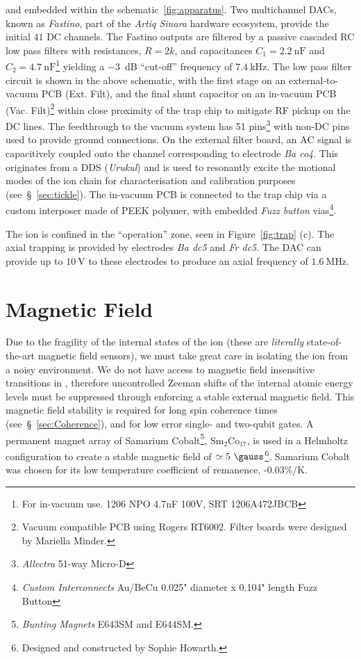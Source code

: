     \noindent and embedded within the schematic~\ref{fig:apparatus}. Two
    multichannel DACs, known as \emph{Fastino}, part of the \emph{Artiq Sinara} hardware
    ecosystem, provide the initial $41$ DC channels. 
    The Fastino outputs are filtered by a passive cascaded RC low pass filters with resistances, $R=2k$, and capacitances $C_1 = 2.2~\unit{\nano\farad}$ and $C_2 = 4.7~\unit{\nano\farad}$\footnote{For in-vacuum use. 1206 NPO 4.7nF 100V, SRT 1206A472JBCB} yielding a $-3$~dB ``cut-off'' frequency of $7.4~\unit{\kilo\hertz}$. The low pass filter circuit is shown in the above schematic, with the first stage on an external-to-vacuum PCB (Ext. Filt), and the 
    final shunt capacitor on an in-vacuum PCB (Vac. Filt)\footnote{Vacuum compatible PCB using Rogers RT6002. Filter boards were designed by Mariella Minder.} within close proximity of the trap chip to mitigate RF pickup on the DC lines. The feedthrough to the vacuum system has 51 pins\footnote{\emph{Allectra} 51-way Micro-D} with non-DC pins used to provide ground connections.
    On the external filter board, an AC signal is capacitively coupled onto the channel corresponding to electrode \textit{Ba co4}.
    This originates from a DDS (\emph{Urukul}) and is used to resonantly excite the motional modes of the ion chain for characterisation and calibration purposes (see~\S~\ref{sec:tickle}).
    The in-vacuum PCB is connected to the trap chip via a custom interposer made of PEEK polymer, with embedded \emph{Fuzz button} vias\footnote{\emph{Custom Interconnects} Au/BeCu 0.025" diameter x 0.104" length Fuzz Button}.

    The ion is confined in the ``operation'' zone, seen in
    Figure~\ref{fig:trap} (c). The axial trapping is provided by electrodes
    \textit{Ba dc5} and \textit{Fr dc5}.
    The DAC can provide up to $10~\unit{\volt}$ to these electrodes to produce an axial frequency of $1.6~\unit{\mega\hertz}$.

\section{Magnetic Field}
\label{sec:Magnetic Field}
    Due to the fragility of
    the internal states of the ion (these are \textit{literally}
    state-of-the-art magnetic field sensors), we must take great care in
    isolating the ion from a noisy
    environment.
    We do not have access to magnetic field insensitive transitions in \ca , therefore uncontrolled Zeeman shifts of the internal atomic energy levels must be suppressed through enforcing a stable external magnetic field. This magnetic field stability is required for long spin
    coherence times (see~\S~\ref{sec:Coherence}), and for low error single-
    and two-qubit gates. A permanent magnet array of Samarium Cobalt\footnote{\emph{Bunting Magnets} E643SM and E644SM.},
    Sm$_2$Co$_{17}$, is used in a Helmholtz configuration to create a stable magnetic
    field of $\simeq 5~\unit{\gauss}$\footnote{Designed and constructed by Sophie Howarth.}. Samarium Cobalt was chosen for its low temperature
    coefficient of remanence, -0.03\%/K.


